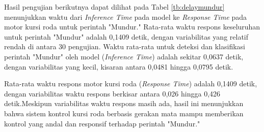 Hasil pengujian berikutnya dapat dilihat pada Tabel \ref{tb:delaymundur} menunjukkan waktu dari \emph{Inference Time} pada model ke \emph{Response Time} pada motor kursi roda untuk perintah "Mundur." Rata-rata waktu respons keseluruhan untuk perintah "Mundur" adalah 0,1409 detik, dengan variabilitas yang relatif rendah di antara 30 pengujian. Waktu rata-rata untuk deteksi dan klasifikasi perintah "Mundur" oleh model (\emph{Inference Time}) adalah sekitar 0,0637 detik, dengan variabilitas yang kecil, kisaran antara 0,0481 hingga 0,0795 detik.

Rata-rata waktu respons motor kursi roda (\emph{Response Time}) adalah 0,1409 detik, dengan variabilitas waktu respons berkisar antara 0,026 hingga 0,426 detik.Meskipun variabilitas waktu respons masih ada, hasil ini menunjukkan bahwa sistem kontrol kursi roda berbasis gerakan mata mampu memberikan kontrol yang andal dan responsif terhadap perintah "Mundur."

